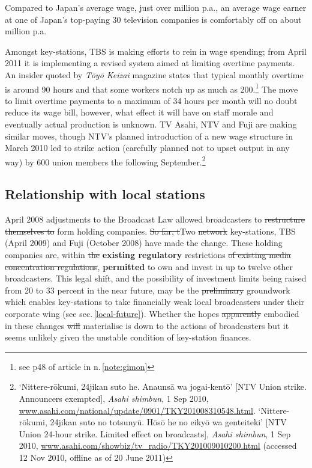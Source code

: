 \documentclass[11pt, oneside, a4paper, headsepline]{scrartcl}
\newcommand{\TYKZ}{\emph{T\={o}y\={o} Keizai}}
\newcommand{\ty}{\textyen}
\begin{document}
Compared to Japan's average wage, just over \ty4 million p.a., an average wage earner at one of Japan's top-paying 30 television companies is comfortably off on about \ty10 million p.a. %

Amongst key-stations, TBS is making efforts to rein in wage spending; from April 2011 it is implementing a revised system aimed at limiting overtime payments. An insider quoted by \TYKZ{ } magazine states that typical monthly overtime is around 90 hours and that some workers notch up as much as 200.\footnote{see p48 of article in n.\,\ref{note:gimon}} The move to limit overtime payments to a maximum of 34 hours per month will no doubt reduce its wage bill, however, what effect it will have on staff morale and eventually actual production is unknown. TV Asahi, NTV and Fuji are making similar moves, though NTV's planned introduction of a new wage structure in March 2010 led to strike action (carefully planned not to upset output in any way) by 600 union members the following September.\footnote{`Nittere-r\={o}kumi, 24jikan suto he. Anauns\={a} wa jogai-kent\={o}' [NTV Union strike. Announcers exempted], \emph{Asahi shimbun}, 1 Sep 2010, \url{www.asahi.com/national/update/0901/TKY201008310548.html}. `Nittere-r\={o}kumi, 24jikan suto no totsuny\={u}. H\={o}s\={o} he no eiky\={o} wa genteiteki' [NTV Union 24-hour strike. Limited effect on broadcasts], \emph{Asahi shimbun}, 1 Sep 2010, \url{www.asahi.com/showbiz/tv_radio/TKY201009010200.html}  (accessed 12 Nov 2010, offline as of 20 June 2011)}

\subsection{Relationship with local stations}%
\label{para:relwlocals}
April 2008 adjustments to the Broadcast Law allowed broadcasters to \st{restructure themselves to} form holding companies. \st{So far, t}Two \st{network} key-stations, TBS (April 2009) and Fuji (October 2008) have made the change. These holding companies are, within \st{the} \textbf{existing regulatory} restrictions \st{of existing media concentration regulations}, \textbf{permitted} to own and invest in up to twelve other broadcasters. This legal shift, and the possibility of investment limits being raised from 20 to 33 percent in the near future, may be the \st{preliminary} groundwork which enables key-stations to take financially weak local broadcasters under their corporate wing (see sec.\,\ref{local-future}). Whether the hopes \st{apparently} embodied in these changes \st{will} materialise is down to the actions of broadcasters but it seems unlikely given the unstable condition of key-station finances.
\end{document}
